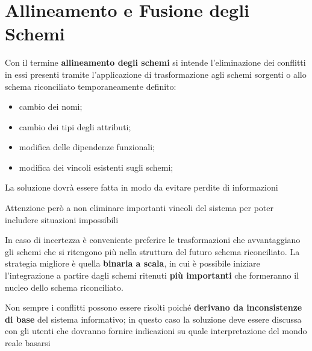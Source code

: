 \section{Allineamento e Fusione degli Schemi}\label{sec:db_allineamento_e_fusione_degli_schemi} %
Con il termine \textbf{allineamento degli schemi} si intende l'eliminazione dei conflitti in essi presenti tramite l'applicazione di trasformazione agli schemi sorgenti o allo schema riconciliato temporaneamente definito:
\begin{itemize}
    \item cambio dei nomi;
    \item cambio dei tipi degli attributi;
    \item modifica delle dipendenze funzionali;
    \item modifica dei vincoli esistenti sugli schemi;
\end{itemize}
\begin{critical}
    La soluzione dovrà essere fatta in modo da evitare perdite di informazioni
\end{critical}
\begin{warning}
    Attenzione però a non eliminare importanti vincoli del sistema per poter includere situazioni impossibili
\end{warning}
In caso di incertezza è conveniente preferire le trasformazioni che avvantaggiano gli schemi che si ritengono più  nella struttura del futuro schema riconciliato.
La strategia migliore è quella \textbf{binaria a scala}, in cui è possibile iniziare l'integrazione a partire dagli schemi ritenuti \textbf{più importanti} che formeranno il nucleo dello schema riconciliato.
\begin{note}
    Non sempre i conflitti possono essere risolti poiché \textbf{derivano da inconsistenze di base} del sistema informativo; in questo caso la soluzione deve essere discussa con gli utenti che dovranno fornire indicazioni su quale interpretazione del mondo reale basarsi
\end{note}
%

